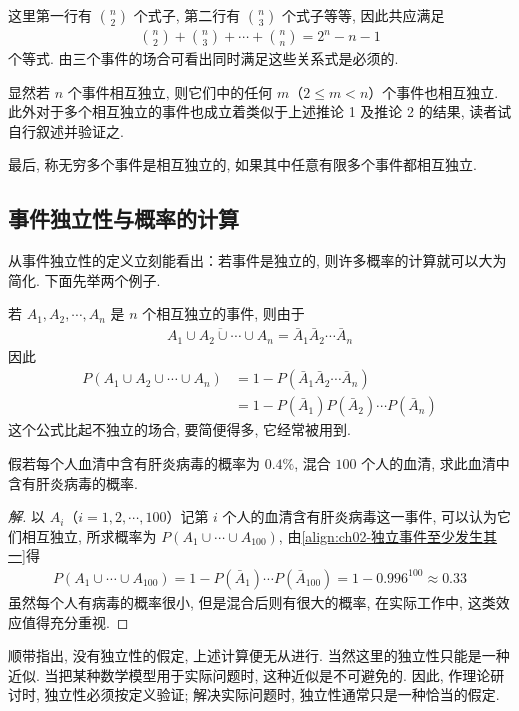 \documentclass[../../main.tex]{subfiles}
\begin{document}
这里第一行有 $\binom{n}{2}$ 个式子, 第二行有 $\binom{n}{3}$ 个式子等等, 因此共应满足
\begin{align*}
\binom{n}{2}+\binom{n}{3}+\cdots+\binom{n}{n}=2^n-n-1
\end{align*}
个等式. 由三个事件的场合可看出同时满足这些关系式是必须的.

显然若 $n$ 个事件相互独立, 则它们中的任何 $m$（$2\leqslant m<n$）个事件也相互独立. 此外对于多个相互独立的事件也成立着类似于上述推论 1 及推论 2 的结果, 读者试自行叙述并验证之.

最后, 称无穷多个事件是相互独立的, 如果其中任意有限多个事件都相互独立.

\subsection{事件独立性与概率的计算}

从事件独立性的定义立刻能看出：若事件是独立的, 则许多概率的计算就可以大为简化. 下面先举两个例子.

\begin{remark}[相互独立事件至少发生其一的概率的计算]\label{remark:ch02-独立事件至少发生其一}
若 $A_1, A_2, \cdots, A_n$ 是 $n$ 个相互独立的事件, 则由于
\begin{align*}
\overline{A_1\cup A_2\cup\cdots\cup A_n}=\bar{A}_1\bar{A}_2\cdots\bar{A}_n
\end{align*}
因此
\begin{align}\label{align:ch02-独立事件至少发生其一}
P(A_1\cup A_2\cup\cdots\cup A_n)&=1-P(\bar{A}_1\bar{A}_2\cdots\bar{A}_n)\\
&=1-P(\bar{A}_1)P(\bar{A}_2)\cdots P(\bar{A}_n)\nonumber
\end{align}
这个公式比起不独立的场合, 要简便得多, 它经常被用到.
\end{remark}

\begin{example}[混合血清中的肝炎病毒]\label{example:ch02-混合血清肝炎病毒}
假若每个人血清中含有肝炎病毒的概率为 $0.4\%$, 混合 $100$ 个人的血清, 求此血清中含有肝炎病毒的概率.

\begin{proof}[解]
以 $A_i$（$i=1,2,\cdots,100$）记第 $i$ 个人的血清含有肝炎病毒这一事件, 可以认为它们相互独立, 所求概率为 $P(A_1\cup\cdots\cup A_{100})$, 由\eqref{align:ch02-独立事件至少发生其一}得
\begin{align*}
P(A_1\cup\cdots\cup A_{100})=1-P(\bar{A}_1)\cdots P(\bar{A}_{100})=1-0.996^{100}\approx 0.33
\end{align*}
虽然每个人有病毒的概率很小, 但是混合后则有很大的概率, 在实际工作中, 这类效应值得充分重视.
\end{proof}

顺带指出, 没有独立性的假定, 上述计算便无从进行. 当然这里的独立性只能是一种近似. 当把某种数学模型用于实际问题时, 这种近似是不可避免的. 因此, 作理论研讨时, 独立性必须按定义验证; 解决实际问题时, 独立性通常只是一种恰当的假定.
\end{example}
\end{document}
